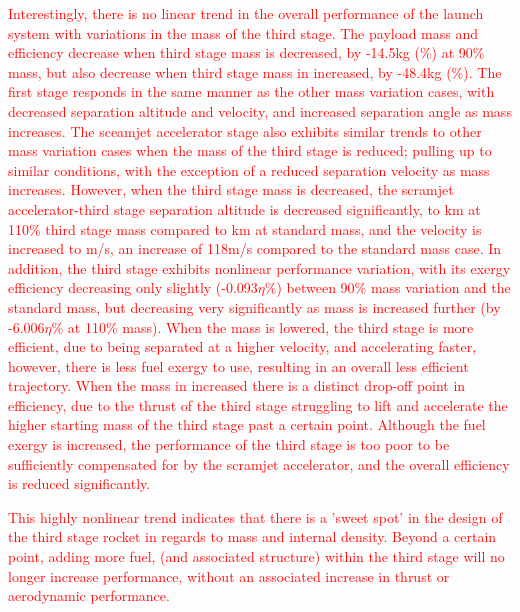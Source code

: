 \textcolor{red}{Interestingly, there is no linear trend in the overall performance of the launch system with variations in the mass of the third stage. The payload mass and efficiency decrease when third stage mass is decreased, by -14.5kg (\PayloadVarmThreeNinetyNoReturn\%) at 90\% mass, but also decrease when third stage mass in increased, by -48.4kg (\PayloadVarmThreeOneHundredTenNoReturn\%). 
	The first stage responds in the same manner as the other mass variation cases, with decreased separation altitude and velocity, and increased separation angle as mass increases. The sceamjet accelerator stage also exhibits similar trends to other mass variation cases when the mass of the third stage is reduced; pulling up to similar conditions, with the exception of a reduced separation velocity as mass increases. However, when the third stage mass is decreased, the scramjet accelerator-third stage separation altitude is decreased significantly, to \secondthirdSeparationAltmThreeOneHundredTenNoReturn km at 110\% third stage mass compared to \secondthirdSeparationAltStandardNoReturn km at standard mass, and the velocity is increased to \secondthirdSeparationvmThreeOneHundredTenNoReturn m/s, an increase of 118m/s compared to the standard mass case. In addition, the third stage exhibits nonlinear performance variation, with its exergy efficiency decreasing only slightly (-0.093$\eta$\%) between 90\% mass variation and the standard mass, but decreasing very significantly as mass is increased further (by -6.006$\eta$\% at 110\% mass). When the mass is lowered, the third stage is more efficient, due to being separated at a higher velocity, and accelerating faster, however, there is less fuel exergy to use, resulting in an overall less efficient trajectory. When the mass in increased there is a distinct drop-off point in efficiency, due to the thrust of the third stage struggling to lift and accelerate the higher starting mass of the third stage past a certain point. Although the fuel exergy is increased, the performance of the third stage is too poor to be sufficiently compensated for by the scramjet accelerator, and the overall efficiency is reduced significantly. 
}

\textcolor{red}{This highly nonlinear trend indicates that there is a 'sweet spot' in the design of the third stage rocket in regards to mass and internal density. Beyond a certain point, adding more fuel, (and associated structure) within the third stage will no longer increase performance, without an associated increase in thrust or aerodynamic performance.}

